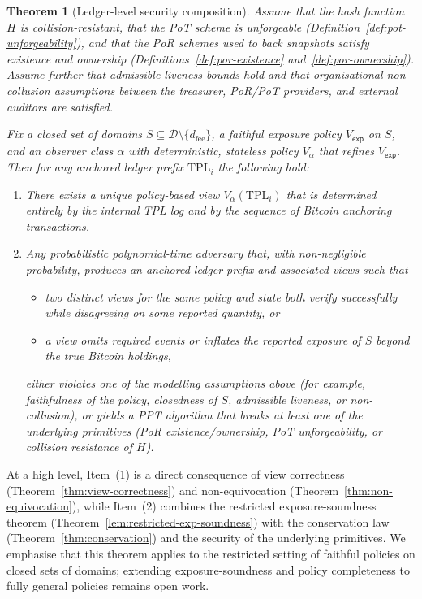 \documentclass[11pt]{article}
\newtheorem{theorem}{Theorem}
\begin{document}
\begin{theorem}[Ledger-level security composition]
\label{thm:ledger-level-security}
Assume that the hash function $H$ is collision-resistant, that the PoT scheme is unforgeable 
(Definition~\ref{def:pot-unforgeability}), and that the PoR schemes used to back snapshots satisfy 
existence and ownership (Definitions~\ref{def:por-existence} and~\ref{def:por-ownership}).
Assume further that admissible liveness bounds hold and that organisational non-collusion assumptions
between the treasurer, PoR/PoT providers, and external auditors are satisfied.

Fix a closed set of domains $S \subseteq \mathcal{D} \setminus \{d_{\mathrm{fee}}\}$, a faithful exposure policy
$V_{\mathsf{exp}}$ on $S$, and an observer class $\alpha$ with deterministic, stateless policy $V_\alpha$ that refines
$V_{\mathsf{exp}}$.
Then for any anchored ledger prefix $\mathrm{TPL}_i$ the following hold:
\begin{enumerate}[noitemsep]
\item There exists a unique policy-based view $V_\alpha(\mathrm{TPL}_i)$ that is determined entirely by the internal
      TPL log and by the sequence of Bitcoin anchoring transactions.
\item Any probabilistic polynomial-time adversary that, with non-negligible probability, produces
      an anchored ledger prefix and associated views such that
      \begin{itemize}[noitemsep]
      \item[(a)] two distinct views for the same policy and state both verify successfully while disagreeing on some
                 reported quantity, or
      \item[(b)] a view omits required events or inflates the reported exposure of $S$ beyond the true Bitcoin holdings,
      \end{itemize}
      either violates one of the modelling assumptions above (for example, faithfulness of the policy,
      closedness of $S$, admissible liveness, or non-collusion), or yields a PPT algorithm that breaks at
      least one of the underlying primitives (PoR existence/ownership, PoT unforgeability, or collision
      resistance of $H$).
\end{enumerate}
\end{theorem}

\noindent
At a high level, Item~(1) is a direct consequence of view correctness
(Theorem~\ref{thm:view-correctness}) and non-equivocation
(Theorem~\ref{thm:non-equivocation}), while Item~(2) combines the restricted exposure-soundness theorem
(Theorem~\ref{lem:restricted-exp-soundness}) with the conservation law
(Theorem~\ref{thm:conservation}) and the security of the underlying primitives.
We emphasise that this theorem applies to the restricted setting of faithful policies on closed sets of domains;
extending exposure-soundness and policy completeness to fully general policies remains open work.
\end{document}
